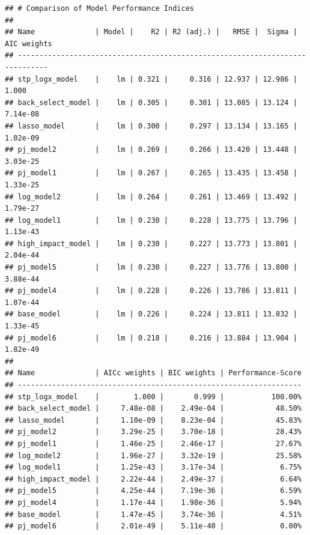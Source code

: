 \documentclass[
]{article}
\begin{document}
\begin{verbatim}
## # Comparison of Model Performance Indices
## 
## Name              | Model |    R2 | R2 (adj.) |   RMSE |  Sigma | AIC weights
## -----------------------------------------------------------------------------
## stp_logx_model    |    lm | 0.321 |     0.316 | 12.937 | 12.986 |       1.000
## back_select_model |    lm | 0.305 |     0.301 | 13.085 | 13.124 |    7.14e-08
## lasso_model       |    lm | 0.300 |     0.297 | 13.134 | 13.165 |    1.02e-09
## pj_model2         |    lm | 0.269 |     0.266 | 13.420 | 13.448 |    3.03e-25
## pj_model1         |    lm | 0.267 |     0.265 | 13.435 | 13.458 |    1.33e-25
## log_model2        |    lm | 0.264 |     0.261 | 13.469 | 13.492 |    1.79e-27
## log_model1        |    lm | 0.230 |     0.228 | 13.775 | 13.796 |    1.13e-43
## high_impact_model |    lm | 0.230 |     0.227 | 13.773 | 13.801 |    2.04e-44
## pj_model5         |    lm | 0.230 |     0.227 | 13.776 | 13.800 |    3.88e-44
## pj_model4         |    lm | 0.228 |     0.226 | 13.786 | 13.811 |    1.07e-44
## base_model        |    lm | 0.226 |     0.224 | 13.811 | 13.832 |    1.33e-45
## pj_model6         |    lm | 0.218 |     0.216 | 13.884 | 13.904 |    1.82e-49
## 
## Name              | AICc weights | BIC weights | Performance-Score
## ------------------------------------------------------------------
## stp_logx_model    |        1.000 |       0.999 |           100.00%
## back_select_model |     7.48e-08 |    2.49e-04 |            48.50%
## lasso_model       |     1.10e-09 |    8.23e-04 |            45.83%
## pj_model2         |     3.29e-25 |    3.70e-18 |            28.43%
## pj_model1         |     1.46e-25 |    2.46e-17 |            27.67%
## log_model2        |     1.96e-27 |    3.32e-19 |            25.58%
## log_model1        |     1.25e-43 |    3.17e-34 |             6.75%
## high_impact_model |     2.22e-44 |    2.49e-37 |             6.64%
## pj_model5         |     4.25e-44 |    7.19e-36 |             6.59%
## pj_model4         |     1.17e-44 |    1.98e-36 |             5.94%
## base_model        |     1.47e-45 |    3.74e-36 |             4.51%
## pj_model6         |     2.01e-49 |    5.11e-40 |             0.00%
\end{verbatim}
\end{document}
